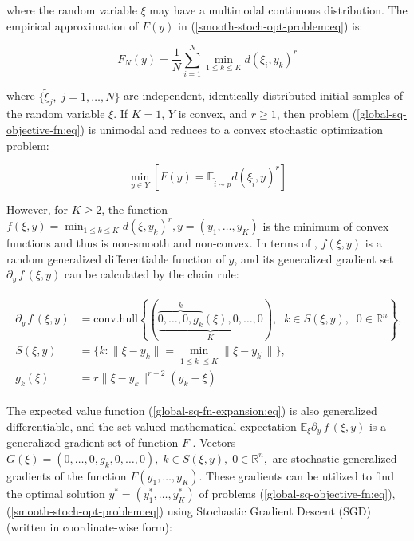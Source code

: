 \noindent where the random variable $\xi$ may have a multimodal continuous distribution. The empirical approximation of $F(y)$ in (\ref{smooth-stoch-opt-problem:eq}) is:

\begin{equation}
    \label{empirical-stoch-fn-expansion:eq}
    F_N(y) = \frac{1}{N} \sum_{i=1}^N \min_{1 \leq k \leq K} d(\xi_i, y_k)^r
\end{equation}

\noindent where $\{\tilde{\xi}_j,\; j = 1, \ldots, N\}$ are independent, identically distributed initial samples of the random variable $\xi$. If $K = 1$, $Y$ is convex, and $r\geq 1$, then problem (\ref{global-sq-objective-fn:eq}) is unimodal and reduces to a convex stochastic optimization problem:

\begin{equation}
    \label{convex-stoch-opt-problem:eq}
    \min_{y \in Y} [ F(y) =  \mathbb{E}_{\tilde{i} \sim p} d(\xi_{\tilde{i}}, y)^r ]
\end{equation}

However, for $K \geq 2$, the function $f(\xi, y) = \min_{1 \leq k \leq K} d(\xi, y_k)^r, y = (y_1, \ldots, y_K)$ is the minimum of convex functions and thus is non-smooth and non-convex. In terms of \cite{mikhalevich2024,Norkin_1986}, $f(\xi, y)$ is a random generalized differentiable function of $y$, and its generalized gradient set $\partial_y \,f\,(\xi,y)$ can be calculated by the chain rule:

\begin{eqnarray}
    \label{sq-objective-fn-gradient:eq}
    \begin{aligned}
        \partial_y \,f\,(\xi, y) &= \text{conv.hull} \left\{ \left(\underbrace{\overbrace{0, \ldots, 0, g_{k}}^k(\xi), 0, \ldots, 0}_K\right), \;\; k \in S(\xi, y), \;\; 0 \in \mathbb{R}^n \right\}, \\
        S(\xi, y) &= \{ k: \| \xi - y_{k} \| = \min_{1 \leq k^{\prime} \leq K} \| \xi - y_{k^{\prime}} \| \}, \\
        g_{k}(\xi) &= r \| \xi - y_{k} \|^{r - 2} (y_{k} - \xi)
    \end{aligned}
\end{eqnarray}

The expected value function (\ref{global-sq-fn-expansion:eq}) is also generalized differentiable, and the set-valued mathematical expectation $\mathbb{E}_{\xi} \partial_y\, f\,(\xi, y)$ is a generalized gradient set of function $F$ \cite{mikhalevich2024,Norkin_1986}. Vectors $G(\xi) = (0, \ldots, 0, g_k, 0, \ldots, 0), \;k \in S(\xi, y), \;0 \in \mathbb{R}^n,$ are stochastic generalized gradients of the function $F(y_1, \ldots, y_K)$. These gradients can be utilized to find the optimal solution $y^{*}=(y_1^{*},\ldots,y_K^{*})$ of problems (\ref{global-sq-objective-fn:eq}), (\ref{smooth-stoch-opt-problem:eq}) using Stochastic Gradient Descent (SGD) \cite{Robbins_Monro_1951,kiefer1952stochastic,ermoliev1976stochastic,Norkin_Kozyriev_Norkin_2024} (written in coordinate-wise form):

